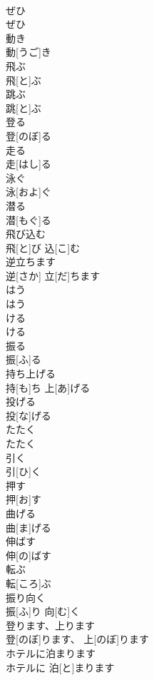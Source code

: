 \documentclass[8pt]{extreport}
\begin{document}
\begin{CJK}{UTF8}{min}
\\	ぜひ	
\\	ぜひ		
\\	動き	
\\	動[うご]き		
\\	飛ぶ	
\\	飛[と]ぶ		
\\	跳ぶ	
\\	跳[と]ぶ		
\\	登る	
\\	登[のぼ]る		
\\	走る	
\\	走[はし]る		
\\	泳ぐ	
\\	泳[およ]ぐ		
\\	潜る	
\\	潜[もぐ]る		
\\	飛び込む	
\\	飛[と]び 込[こ]む		
\\	逆立ちます	
\\	逆[さか] 立[だ]ちます		
\\	はう	
\\	はう		
\\	ける	
\\	ける		
\\	振る	
\\	振[ふ]る		
\\	持ち上げる	
\\	持[も]ち 上[あ]げる		
\\	投げる	
\\	投[な]げる		
\\	たたく	
\\	たたく		
\\	引く	
\\	引[ひ]く		
\\	押す	
\\	押[お]す		
\\	曲げる	
\\	曲[ま]げる		
\\	伸ばす	
\\	伸[の]ばす		
\\	転ぶ	
\\	転[ころ]ぶ		
\\	振り向く	
\\	振[ふ]り 向[む]く		
\\	登ります、上ります	
\\	登[のぼ]ります、 上[のぼ]ります		
\\	ホテルに泊まります	
\\	ホテルに 泊[と]まります		

\end{CJK}
\end{document}
